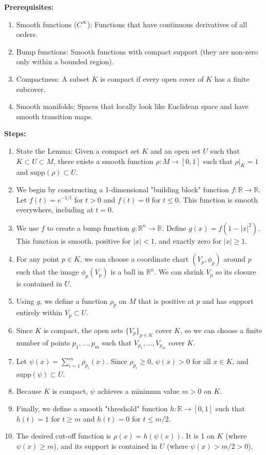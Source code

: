 \begin{solution}
\textbf{Prerequisites:}
\begin{enumerate}
    \item Smooth functions ($C^\infty$): Functions that have continuous derivatives of all orders.
    \item Bump functions: Smooth functions with compact support (they are non-zero only within a bounded region).
    \item Compactness: A subset $K$ is compact if every open cover of $K$ has a finite subcover.
    \item Smooth manifolds: Spaces that locally look like Euclidean space and have smooth transition maps.
\end{enumerate}

\textbf{Steps:}
\begin{enumerate}
    \item State the Lemma: Given a compact set $K$ and an open set $U$ such that $K \subset U \subset M$, there exists a smooth function $\rho: M \to [0, 1]$ such that $\rho|_K = 1$ and $\text{supp}(\rho) \subset U$.
    \item We begin by constructing a 1-dimensional "building block" function $f: \mathbb{R} \to \mathbb{R}$. Let $f(t) = e^{-1/t}$ for $t > 0$ and $f(t) = 0$ for $t \le 0$. This function is smooth everywhere, including at $t = 0$.
    \item We use $f$ to create a bump function $g: \mathbb{R}^n \to \mathbb{R}$. Define $g(x) = f(1 - |x|^2)$. This function is smooth, positive for $|x| < 1$, and exactly zero for $|x| \ge 1$.
    \item For any point $p \in K$, we can choose a coordinate chart $(V_p, \phi_p)$ around $p$ such that the image $\phi_p(V_p)$ is a ball in $\mathbb{R}^n$. We can shrink $V_p$ so its closure is contained in $U$.
    \item Using $g$, we define a function $\rho_p$ on $M$ that is positive at $p$ and has support entirely within $V_p \subset U$.
    \item Since $K$ is compact, the open sets $\{V_p\}_{p \in K}$ cover $K$, so we can choose a finite number of points $p_1, \dots, p_m$ such that $V_{p_1}, \dots, V_{p_m}$ cover $K$.
    \item Let $\psi(x) = \sum_{i=1}^m \rho_{p_i}(x)$. Since $\rho_{p_i} \ge 0$, $\psi(x) > 0$ for all $x \in K$, and $\text{supp}(\psi) \subset U$.
    \item Because $K$ is compact, $\psi$ achieves a minimum value $m > 0$ on $K$.
    \item Finally, we define a smooth "threshold" function $h: \mathbb{R} \to [0, 1]$ such that $h(t) = 1$ for $t \ge m$ and $h(t) = 0$ for $t \le m/2$.
    \item The desired cut-off function is $\rho(x) = h(\psi(x))$. It is 1 on $K$ (where $\psi(x) \ge m$), and its support is contained in $U$ (where $\psi(x) > m/2 > 0$).
\end{enumerate}


\end{solution}
